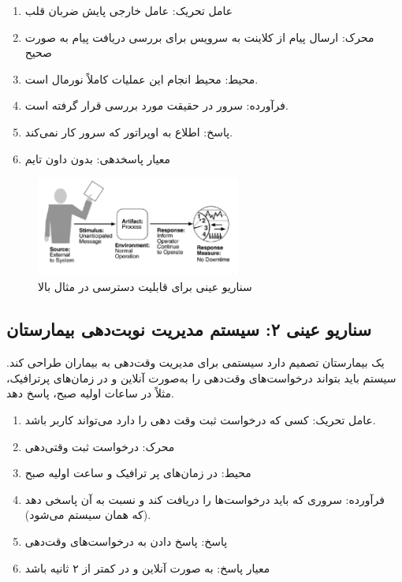 \begin{multicols}{3}
    \begin{enumerate}
        \item عامل تحریک: عامل خارجی پایش ضربان قلب
        \item محرک: ارسال پیام از کلاینت به سرویس برای بررسی دریافت پیام به صورت صحیح
        \item محیط: محیط انجام این عملیات کاملاً نورمال است.
        \item فرآورده: سرور در حقیقت مورد بررسی قرار گرفته است.
        \item پاسخ: اطلاع به اوپراتور که سرور کار نمی‌کند.
        \item معیار پاسخدهی: بدون داون تایم
    \end{enumerate}
\end{multicols}

\begin{figure}[H]
    \centering
    \includegraphics[width=0.6\textwidth]{images/heartbeat-system-concrete-scenario.png}
    \caption{سناریو عینی برای قابلیت دسترسی در مثال بالا}
    \label{fig:heartbeatExampleConcreteScenrario}
\end{figure}

\subsection{سناریو عینی ۲: سیستم مدیریت نوبت‌دهی بیمارستان}

یک بیمارستان تصمیم دارد سیستمی برای مدیریت وقت‌دهی به بیماران طراحی کند. سیستم
باید بتواند درخواست‌های وقت‌دهی را به‌صورت آنلاین و در زمان‌های پرترافیک، مثلاً
در ساعات اولیه صبح، پاسخ دهد.

\begin{multicols}{3}
   \begin{enumerate}
    \item عامل تحریک: کسی که درخواست ثبت وقت دهی را دارد می‌تواند کاربر باشد.
    \item محرک: درخواست ثبت وقتی‌دهی
    \item محیط: در زمان‌های پر ترافیک و ساعت اولیه صبح
    \item فرآورده: سروری که باید درخواست‌ها را دریافت کند و نسبت به آن پاسخی دهد
    (که همان سیستم می‌شود).
    \item پاسخ: پاسخ دادن به درخواست‌های وقت‌دهی
    \item معیار پاسخ: به صورت آنلاین و در کمتر از ۲ ثانیه باشد
   \end{enumerate} 
\end{multicols}

